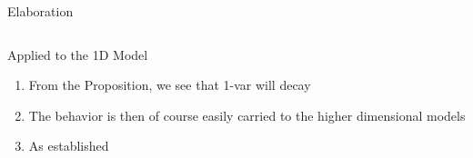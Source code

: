 \documentclass[aspectratio=169,  notheorems, sOuRcEs]{RUCPresentation}
\begin{document}
\begin{frame}{ Elaboration }

    \begin{columns}

        \column{0.5\framewidth}

        \column{0.5\framewidth}

    \end{columns}

\end{frame}


\begin{frame}{Applied to the 1D Model}

    \begin{enumerate}
        \item From the Proposition, we see that 1-var will decay
        \item The behavior is then of course easily carried to the higher
            dimensional models
        \item As established
    \end{enumerate}

\end{frame}


%
%
%
%
\end{document}
